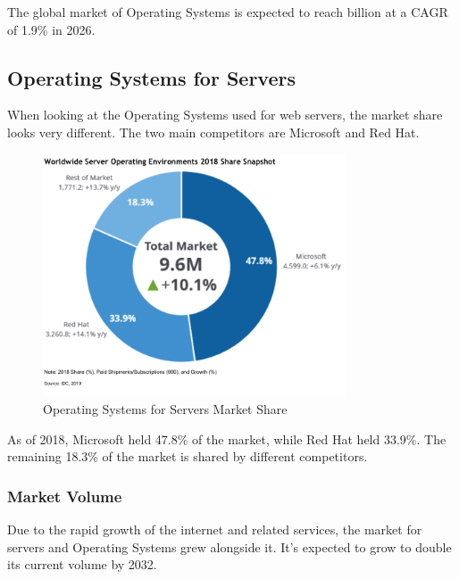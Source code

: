 The global market of Operating Systems is expected to reach  billion at a CAGR of 1.9\% in 2026. 
\cite{OsMarketShare3}

\cite{OsMarketShare}
\cite{OsWikipedia}

\subsection{Operating Systems for Servers}

When looking at the Operating Systems used for web servers, the market share looks very different.
The two main competitors are Microsoft and Red Hat. 

\begin{figure}[H]
    \centering
    \includegraphics[width=0.8\textwidth]{figures/server-operating-system-market-share-2018.png}
    \caption{Operating Systems for Servers Market Share}
    \label{fig:Operating_Systems_for_Servers_Market_Share}
\end{figure}

As of 2018, Microsoft held 47.8\% of the market, while Red Hat held 33.9\%. 
The remaining 18.3\% of the market is shared by different competitors.   
\cite{ServerOsMarketShare}

\subsubsection{Market Volume}

Due to the rapid growth of the internet and related services, the market for servers and Operating Systems grew alongside it. 
It's expected to grow to double its current volume by 2032. 

